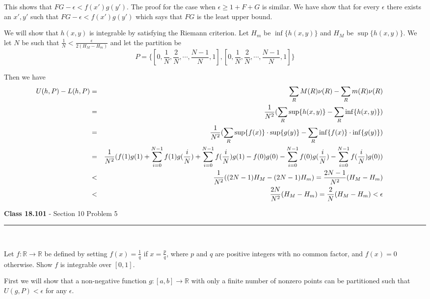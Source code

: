 \documentclass[11pt,reqno]{article}
\begin{document}
\noindent This shows that $FG - \epsilon < f(x') g(y')$. The proof for the case when $\epsilon \ge 1 + F + G$ is similar. We have show that for every $\epsilon$ there exists an $x',y'$ such that $FG - \epsilon < f(x') g(y')$ which says that $FG$ is the least upper bound.

We will show that $h(x,y)$ is integrable by satisfying the Riemann criterion. Let $H_m$ be $\inf \{ h(x,y) \}$ and  $H_M$ be $\sup \{ h(x,y) \}$. We let $N$ be such that $\frac{1}{N} < \frac{\epsilon}{2(H_M - H_m)}$ and let the partition be 
\[ P = \{ [0,\frac{1}{N},\frac{2}{N},\cdots,\frac{N-1}{N},1] , [0,\frac{1}{N},\frac{2}{N},\cdots,\frac{N-1}{N},1] \} \]

Then we have
\begin{eqnarray*}
\hspace{-15pt} U(h,P) - L(h,P) &=& \sum_R M(R) \nu(R) -  \sum_R m(R) \nu(R)\\
&=& \frac{1}{N^2} (\sum_R \sup \{ h(x,y) \} -  \sum_R \inf \{ h(x,y) \} ) \\
&=& \frac{1}{N^2} (\sum_R \sup \{ f(x) \} \cdot \sup \{ g(y) \} -  \sum_R \inf \{ f(x) \} \cdot \inf \{ g(y) \}  ) \\
&=& \frac{1}{N^2} (f(1)g(1) +  \sum_{i = 0}^{N-1} f(1)  g(\frac{i}{N}) + \sum_{i = 0}^{N-1} f(\frac{i}{N})  g(1) -  f(0)g(0) - \sum_{i = 0}^{N-1} f(0)  g(\frac{i}{N}) - \sum_{i = 0}^{N-1} f(\frac{i}{N})  g(0) ) \\
&<& \frac{1}{N^2} ((2N - 1) H_M -  (2N - 1) H_m ) =   \frac{2N -1}{N^2} (H_M - H_m) \\
&<&  \frac{2N}{N^2} (H_M - H_m)  = \frac{2}{N} (H_M - H_m) < \epsilon \\
\end{eqnarray*}

\newpage

\begin{flushleft} 
\textbf{Class 18.101} - Section 10 Problem 5\\
\rule{500pt}{1pt}\\
\end{flushleft} 

Let $f : \mathbb{R} \to \mathbb{R}$ be defined by setting $f(x) = \frac{1}{q}$ if $x = \frac{p}{q}$, where $p$ and $q$ are positive integers with no common factor, and $f(x) = 0$ otherwise. Show $f$ is integrable over $[0,1]$.


First we will show that a non-negative function $g : [a,b] \to \mathbb{R}$ with only a finite number of nonzero points can be partitioned such that $U(g,P) < \epsilon$ for any $\epsilon$.
\end{document}
